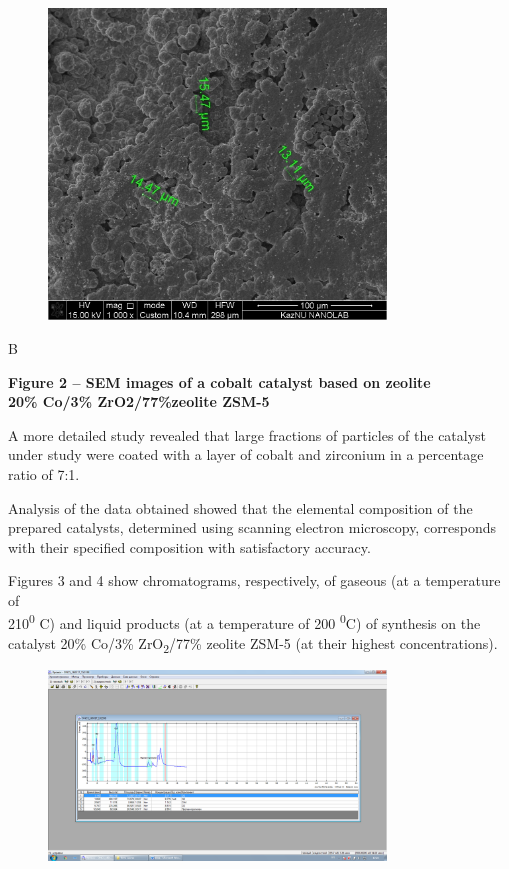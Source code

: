 \begin{figure}[H]
	\centering
	\includegraphics[width=0.8\textwidth]{assets/1078}
	\caption*{}
\end{figure}

B

{\bfseries Figure 2 -- SEM images of a cobalt catalyst based on zeolite\\
20\% Co/3\% ZrO2/77\%zeolite ZSM-5}

A more detailed study revealed that large fractions of particles of the
catalyst under study were coated with a layer of cobalt and zirconium in
a percentage ratio of 7:1.

Analysis of the data obtained showed that the elemental composition of
the prepared catalysts, determined using scanning electron microscopy,
corresponds with their specified composition with satisfactory accuracy.

Figures 3 and 4 show chromatograms, respectively, of gaseous (at a
temperature of\\
210\textsuperscript{0} C) and liquid products (at a temperature of 200
\textsuperscript{0}C) of synthesis on the catalyst 20\% Co/3\%
ZrO\textsubscript{2}/77\% zeolite ZSM-5 (at their highest
concentrations).

\begin{figure}[H]
	\centering
	\includegraphics[width=0.8\textwidth]{assets/1079}
	\caption*{}
\end{figure}

